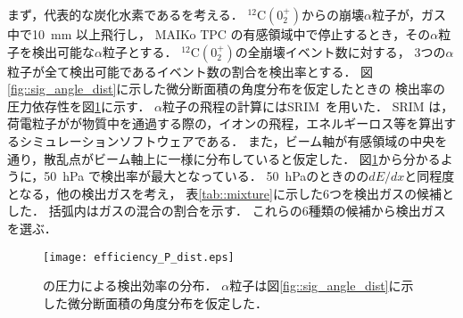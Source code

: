 \documentclass[../master]{subfiles}
\begin{document}
まず，代表的な炭化水素である\Methane を考える．
${}^{12}\mathrm{C}(0_2^+)$からの崩壊$\alpha$粒子が，ガス中で\SI{10}{\milli\metre} 以上飛行し，
MAIKo TPC の有感領域中で停止するとき，その$\alpha$粒子を検出可能な$\alpha$粒子とする．
${}^{12}\mathrm{C}(0_2^+)$の全崩壊イベント数に対する，
3つの$\alpha$粒子が全て検出可能であるイベント数の割合を検出率とする．
図\ref{fig::sig_angle_dist}に示した微分断面積の角度分布を仮定したときの
検出率の圧力依存性を図\ref{fig::efficiency_P_dist}に示す．
$\alpha$粒子の飛程の計算にはSRIM~\cite{SRIM}を用いた．
SRIM は，荷電粒子がが物質中を通過する際の，イオンの飛程，エネルギーロス等を算出するシミュレーションソフトウェアである．
また，ビーム軸が有感領域の中央を通り，散乱点がビーム軸上に一様に分布していると仮定した．
図\ref{fig::efficiency_P_dist}から分かるように，\SI{50}{\hecto\pascal} で検出率が最大となっている．
\SI{50}{\hecto\pascal}のときの\Methane の$dE/dx$と同程度となる，他の検出ガスを考え，
表\ref{tab::mixture}に示した6つを検出ガスの候補とした．
括弧内はガスの混合の割合を示す．
これらの6種類の候補から検出ガスを選ぶ．
\begin{figure}
  \centering
  \texttt{[image: efficiency\_P\_dist.eps]}
  \caption[\Methane の圧力による検出効率の分布．]
          {\Methane の圧力による検出効率の分布．
            $\alpha$粒子は図\ref{fig::sig_angle_dist}に示した微分断面積の角度分布を仮定した．
           }
  \label{fig::efficiency_P_dist}
\end{figure}
\end{document}

